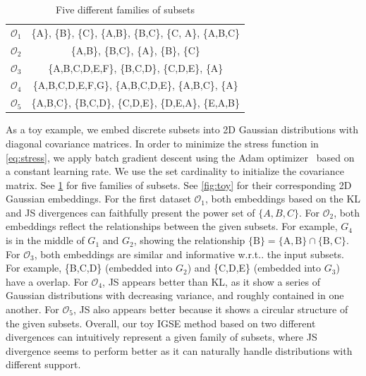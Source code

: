 \documentclass{article}
\makeatletter
\DeclareRobustCommand\onedot{\futurelet\@let@token\bmv@onedotaux}
\def\bmv@onedotaux{\ifx\@let@token.\else.\null\fi\xspace}
\def\wrt{w.r.t\onedot} \def\Wrt{W.r.t\onedot}
\makeatother
\begin{document}
\begin{table}[t]
\centering
\caption{Five different families of subsets}\label{tbl:set}
\begin{tabular}{r|c}
\hline
$\mathcal{O}_1$ & \colorbox{orange!50}{\{A\}}, \colorbox{lightcoral!50}{\{B\}}, \colorbox{seagreen!50}{\{C\}}, \colorbox{cornflowerblue!50}{\{A,B\}}, \colorbox{silver!50}{\{B,C\}}, \colorbox{darkviolet!50}{\{C, A\}}, \colorbox{tomato!50}{\{A,B,C\}}\\
$\mathcal{O}_2$ & \colorbox{orange!50}{\{A,B\}}, \colorbox{lightcoral!50}{\{B,C\}}, \colorbox{seagreen!50}{\{A\}}, \colorbox{cornflowerblue!50}{\{B\}}, \colorbox{silver!50}{\{C\}}\\
$\mathcal{O}_3$ & \colorbox{orange!50}{\{A,B,C,D,E,F\}}, \colorbox{lightcoral!50}{\{B,C,D\}}, \colorbox{seagreen!50}{\{C,D,E\}}, \colorbox{cornflowerblue!50}{\{A\}}\\
$\mathcal{O}_4$ & \colorbox{orange!50}{\{A,B,C,D,E,F,G\}}, \colorbox{lightcoral!50}{\{A,B,C,D,E\}}, \colorbox{seagreen!50}{\{A,B,C\}}, \colorbox{cornflowerblue!50}{\{A\}}\\
$\mathcal{O}_5$ & \colorbox{orange!50}{\{A,B,C\}}, \colorbox{lightcoral!50}{\{B,C,D\}}, \colorbox{seagreen!50}{\{C,D,E\}}, \colorbox{cornflowerblue!50}{\{D,E,A\}}, \colorbox{silver!50}{\{E,A,B\}}\\
\hline
\end{tabular}
\end{table}

As a toy example,
we embed discrete subsets into 2D Gaussian distributions with diagonal
covariance matrices.
In order to minimize the stress function in \cref{eq:stress},
we apply batch gradient descent using the Adam optimizer~\cite{adam} based
on a constant learning rate. We use the set cardinality to initialize the
covariance matrix.
See \cref{tbl:set} for five families of subsets.
See \cref{fig:toy} for their corresponding 2D Gaussian embeddings.
For the first dataset $\mathcal{O}_1$, both embeddings based on the KL
and JS divergences can faithfully present the power set of $\{A,B,C\}$.
For $\mathcal{O}_2$, both embeddings reflect the relationships
between the given subsets. For example,
$G_4$ is in the middle of $G_1$ and $G_2$, showing the relationship
$\{\text{B}\}=\{\text{A},\text{B}\}\cap\{\text{B},\text{C}\}$.
For $\mathcal{O}_3$, both embeddings are similar and informative
\wrt the input subsets. For example, \{B,C,D\} (embedded into $G_2$)
and \{C,D,E\} (embedded into $G_3$) have a overlap.
For $\mathcal{O}_4$, JS appears better than KL, as it show a series of Gaussian
distributions with decreasing variance, and roughly contained in one another.
For $\mathcal{O}_5$, JS also appears better because it shows a circular
structure of the given subsets. Overall, our toy IGSE method based on two
different divergences can intuitively represent a given family of subsets, where
JS divergence seems to perform better as it can naturally handle distributions with
different support.
\end{document}
